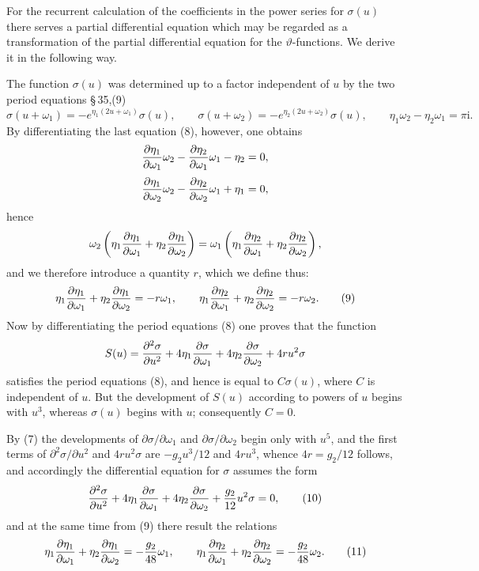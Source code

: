 \documentclass[11pt]{article}
\providecommand{\ii}{\mathrm{i}}
\begin{document}
For the recurrent calculation of the coefficients in the power series for $\sigma(u)$ there serves a partial differential equation which may be regarded as a transformation of the partial differential equation for the $\vartheta$-functions. We derive it in the following way.

The function $\sigma(u)$ was determined up to a factor independent of $u$ by the two period equations \S\,35,(9)
\begin{equation}
\sigma(u+\omega_1)=-e^{\eta_1(2u+\omega_1)}\sigma(u),
\qquad
\sigma(u+\omega_2)=-e^{\eta_2(2u+\omega_2)}\sigma(u),
\qquad
\eta_1\omega_2-\eta_2\omega_1=\pi\ii.
\tag{8}
\end{equation}
By differentiating the last equation (8), however, one obtains
\[
{\partial\eta_1\over\partial\omega_1}\omega_2
-{\partial\eta_2\over\partial\omega_1}\omega_1-
\eta_2=0,
\]
\[
{\partial\eta_1\over\partial\omega_2}\omega_2
-{\partial\eta_2\over\partial\omega_2}\omega_1+
\eta_1=0,
\]
hence
\[
\omega_2\left(\eta_1{\partial\eta_1\over\partial\omega_1}+\eta_2{\partial\eta_1\over\partial\omega_2}\right)
=\omega_1\left(\eta_1{\partial\eta_2\over\partial\omega_1}+\eta_2{\partial\eta_2\over\partial\omega_2}\right),
\]
and we therefore introduce a quantity $r$, which we define thus:
\begin{equation}
\eta_1{\partial\eta_1\over\partial\omega_1}+\eta_2{\partial\eta_1\over\partial\omega_2}=-r\omega_1,
\qquad
\eta_1{\partial\eta_2\over\partial\omega_1}+\eta_2{\partial\eta_2\over\partial\omega_2}=-r\omega_2.
\tag{9}
\end{equation}
Now by differentiating the period equations (8) one proves that the function
\[
S(u)={\partial^2\sigma\over\partial u^2}
+4\eta_1{\partial\sigma\over\partial\omega_1}
+4\eta_2{\partial\sigma\over\partial\omega_2}
+4ru^2\sigma
\]
satisfies the period equations (8), and hence is equal to $C\sigma(u)$, where $C$ is independent of $u$. But the development of $S(u)$ according to powers of $u$ begins with $u^3$, whereas $\sigma(u)$ begins with $u$; consequently $C=0$.

By (7) the developments of $\partial\sigma/\partial\omega_1$ and $\partial\sigma/\partial\omega_2$ begin only with $u^5$, and the first terms of $\partial^2\sigma/\partial u^2$ and $4ru^2\sigma$ are $-g_2u^3/12$ and $4ru^3$, whence $4r=g_2/12$ follows, and accordingly the differential equation for $\sigma$ assumes the form
\begin{equation}
{\partial^2\sigma\over\partial u^2}
+4\eta_1{\partial\sigma\over\partial\omega_1}
+4\eta_2{\partial\sigma\over\partial\omega_2}
+{g_2\over12}u^2\sigma=0,
\tag{10}
\end{equation}
and at the same time from (9) there result the relations
\begin{equation}
\eta_1{\partial\eta_1\over\partial\omega_1}+\eta_2{\partial\eta_1\over\partial\omega_2}=-{g_2\over48}\omega_1,
\qquad
\eta_1{\partial\eta_2\over\partial\omega_1}+\eta_2{\partial\eta_2\over\partial\omega_2}=-{g_2\over48}\omega_2.
\tag{11}
\end{equation}
\end{document}
